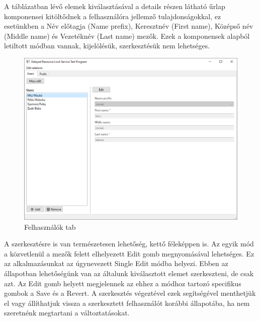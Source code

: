 A táblázatban lévő elemek kiválasztásával a details részen látható űrlap komponensei kitöltődnek a felhasználóra jellemző tulajdonságokkal, ez esetünkben a Név előtagja (Name prefix), Keresztnév (First name), Középső név (Middle name) és Vezetéknév (Last name) mezők. Ezek a komponensek alapból letiltott módban vannak, kijelölésük, szerkesztésük nem lehetséges.

\begin{figure}[H]
	\centering
	\includegraphics[width=1\textwidth]{images/UsersTab.png}
	\caption{Felhasználók tab}
	\label{fig:main_window}
\end{figure}

A szerkesztésre is van természetesen lehetőség, kettő féleképpen is. Az egyik mód a közvetlenül a mezők felett elhelyezett Edit gomb megnyomásával lehetséges. Ez az alkalmazásunkat az úgynevezett Single Edit módba helyezi. Ebben az állapotban lehetőségünk van az általunk kiválasztott elemet szerkeszteni, de csak azt. Az Edit gomb helyett megjelennek az ehhez a módhoz tartozó specifikus gombok a Save és a Revert. A szerkesztés végeztével ezek segítségével menthetjük el vagy állíthatjuk vissza a szerkesztett felhasználót korábbi állapotába, ha nem szeretnénk megtartani a változtatásokat.

